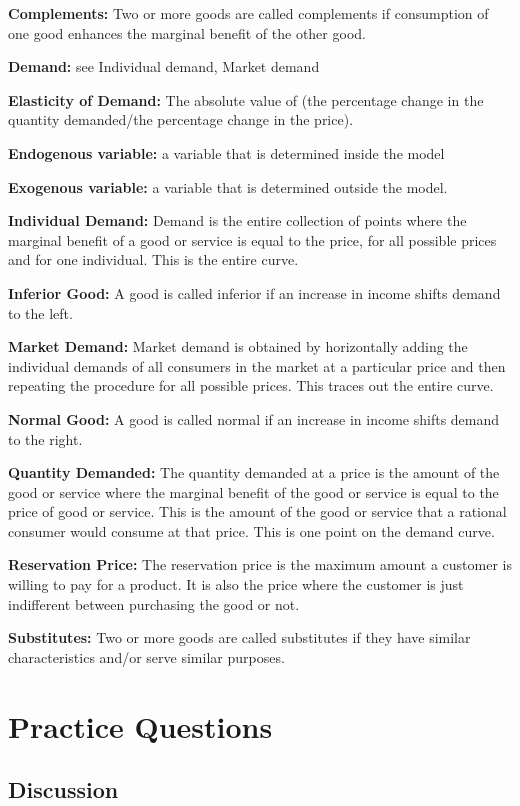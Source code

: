 \documentclass[
]{book}
\begin{document}
\textbf{Complements:} Two or more goods are called complements if consumption of one good enhances the marginal benefit of the other good.

\textbf{Demand:} see Individual demand, Market demand

\textbf{Elasticity of Demand:} The absolute value of (the percentage change in the quantity demanded/the percentage change in the price).

\textbf{Endogenous variable:} a variable that is determined inside the model

\textbf{Exogenous variable:} a variable that is determined outside the model.

\textbf{Individual Demand:} Demand is the entire collection of points where the marginal benefit of a good or service is equal to the price, for all possible prices and for one individual. This is the entire curve.

\textbf{Inferior Good:} A good is called inferior if an increase in income shifts demand to the left.

\textbf{Market Demand:} Market demand is obtained by horizontally adding the individual demands of all consumers in the market at a particular price and then repeating the procedure for all possible prices. This traces out the entire curve.

\textbf{Normal Good:} A good is called normal if an increase in income shifts demand to the right.

\textbf{Quantity Demanded:} The quantity demanded at a price is the amount of the good or service where the marginal benefit of the good or service is equal to the price of good or service. This is the amount of the good or service that a rational consumer would consume at that price. This is one point on the demand curve.

\textbf{Reservation Price:} The reservation price is the maximum amount a customer is willing to pay for a product. It is also the price where the customer is just indifferent between purchasing the good or not.

\textbf{Substitutes:} Two or more goods are called substitutes if they have similar characteristics and/or serve similar purposes.

\hypertarget{practice-questions-3}{%
\section{Practice Questions}\label{practice-questions-3}}

\hypertarget{discussion-3}{%
\subsection{Discussion}\label{discussion-3}}
\end{document}
